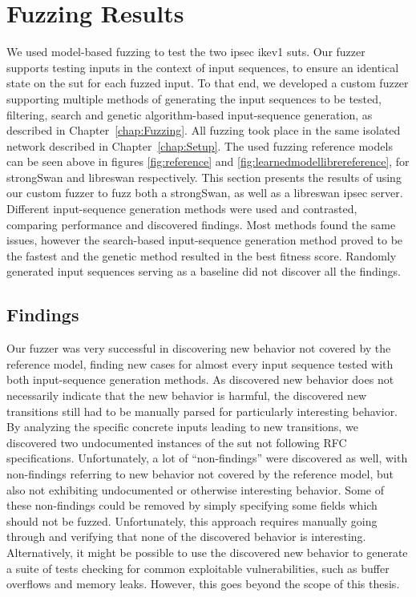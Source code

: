 \section{Fuzzing Results} \label{sec:fuzzresults}
We used model-based fuzzing to test the two \ac{ipsec} \ac{ike}v1 \acp{sut}. Our fuzzer supports testing inputs in the context of input sequences, to ensure an identical state on the \ac{sut} for each fuzzed input. To that end, we developed a custom fuzzer supporting multiple methods of generating the input sequences to be tested, filtering, search and genetic algorithm-based input-sequence generation, as described in Chapter~\ref{chap:Fuzzing}. All fuzzing took place in the same isolated network described in Chapter~\ref{chap:Setup}. The used fuzzing reference models can be seen above in figures \ref{fig:reference} and \ref{fig:learnedmodellibrereference}, for strongSwan and libreswan respectively. This section presents the results of using our custom fuzzer to fuzz both a strongSwan, as well as a libreswan \ac{ipsec} server. Different input-sequence generation methods were used and contrasted, comparing performance and discovered findings. Most methods found the same issues, however the search-based input-sequence generation method proved to be the fastest and the genetic method resulted in the best fitness score. Randomly generated input sequences serving as a baseline did not discover all the findings. \\

\subsection{Findings} \label{subsec:findings}
Our fuzzer was very successful in discovering new behavior not covered by the reference model, finding new cases for almost every input sequence tested with both input-sequence generation methods. As discovered new behavior does not necessarily indicate that the new behavior is harmful, the discovered new transitions still had to be manually parsed for particularly interesting behavior. By analyzing the specific concrete inputs leading to new transitions, we discovered two undocumented instances of the \ac{sut} not following RFC specifications. Unfortunately, a lot of ``non-findings'' were discovered as well, with non-findings referring to new behavior not covered by the reference model, but also not exhibiting undocumented or otherwise interesting behavior. Some of these non-findings could be removed by simply specifying some fields which should not be fuzzed. Unfortunately, this approach requires manually going through and verifying that none of the discovered behavior is interesting. Alternatively, it might be possible to use the discovered new behavior to generate a suite of tests checking for common exploitable vulnerabilities, such as buffer overflows and memory leaks. However, this goes beyond the scope of this thesis.

